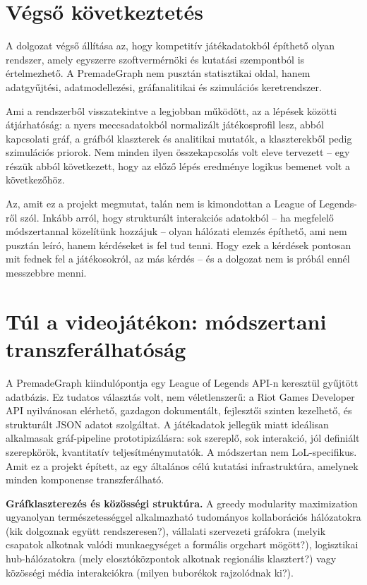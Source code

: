 \section{Végső következtetés}

A dolgozat végső állítása az, hogy kompetitív játékadatokból építhető olyan rendszer, amely egyszerre
szoftvermérnöki és kutatási szempontból is értelmezhető. A PremadeGraph nem pusztán statisztikai
oldal, hanem adatgyűjtési, adatmodellezési, gráfanalitikai és szimulációs keretrendszer.

Ami a rendszerből visszatekintve a legjobban működött, az a lépések közötti átjárhatóság: a nyers meccsadatokból normalizált játékosprofil lesz, abból kapcsolati gráf, a gráfból klaszterek és analitikai mutatók, a klaszterekből pedig szimulációs priorok. Nem minden ilyen összekapcsolás volt eleve tervezett -- egy részük abból következett, hogy az előző lépés eredménye logikus bemenet volt a következőhöz.

Az, amit ez a projekt megmutat, talán nem is kimondottan a League of Legends-ről szól. Inkább arról, hogy strukturált interakciós adatokból -- ha megfelelő módszertannal közelítünk hozzájuk -- olyan hálózati elemzés építhető, ami nem pusztán leíró, hanem kérdéseket is fel tud tenni. Hogy ezek a kérdések pontosan mit fednek fel a játékosokról, az más kérdés -- és a dolgozat nem is próbál ennél messzebbre menni.

\section{Túl a videojátékon: módszertani transzferálhatóság}
\label{sec:osszegzes-transfer}

A PremadeGraph kiindulópontja egy League of Legends API-n keresztül gyűjtött adatbázis. Ez
tudatos választás volt, nem véletlenszerű: a Riot Games Developer API nyilvánosan elérhető,
gazdagon dokumentált, fejlesztői szinten kezelhető, és strukturált JSON adatot szolgáltat.
A játékadatok jellegük miatt ideálisan alkalmasak gráf-pipeline prototipizálásra: sok szereplő,
sok interakció, jól definiált szerepkörök, kvantitatív teljesítménymutatók. A módszertan
nem LoL-specifikus. Amit ez a projekt épített, az egy általános célú kutatási infrastruktúra,
amelynek minden komponense transzferálható.

\textbf{Gráfklaszterezés és közösségi struktúra.} A greedy modularity maximization ugyanolyan
természetességgel alkalmazható tudományos kollaborációs hálózatokra (kik dolgoznak együtt
rendszeresen?), vállalati szervezeti gráfokra (melyik csapatok alkotnak valódi munkaegységet
a formális orgchart mögött?), logisztikai hub-hálózatokra (mely elosztóközpontok alkotnak
regionális klasztert?) vagy közösségi média interakciókra (milyen buborékok rajzolódnak ki?).

